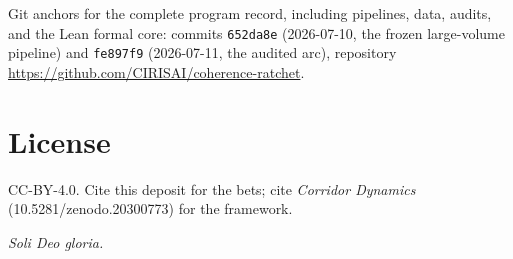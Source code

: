 \documentclass[11pt]{article}
\newcommand{\code}[1]{\texttt{\small #1}}
\begin{document}
Git anchors for the complete program record, including pipelines, data, audits, and the
Lean formal core: commits \code{652da8e} (2026-07-10, the frozen large-volume pipeline)
and \code{fe897f9} (2026-07-11, the audited arc), repository
\url{https://github.com/CIRISAI/coherence-ratchet}.

\section*{License}
CC-BY-4.0. Cite this deposit for the bets; cite \emph{Corridor Dynamics}
(10.5281/zenodo.20300773) for the framework.

\vspace{2em}
\begin{center}
\emph{Soli Deo gloria.}
\end{center}
\end{document}
